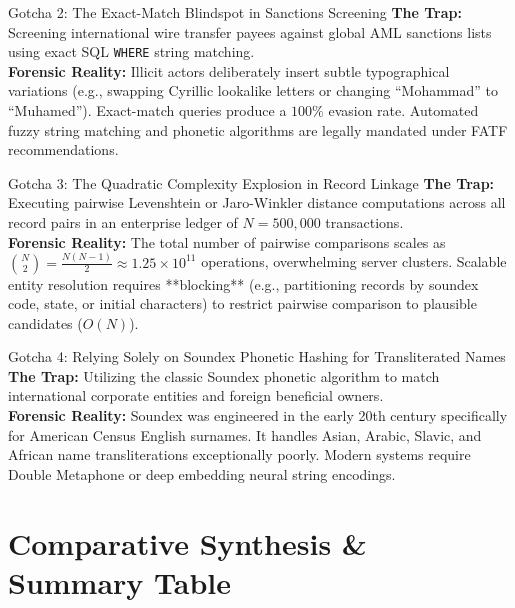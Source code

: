 \begin{trapbox}{Gotcha 2: The Exact-Match Blindspot in Sanctions Screening}
\textbf{The Trap:} Screening international wire transfer payees against global AML sanctions lists using exact SQL \texttt{WHERE} string matching.\\
\textbf{Forensic Reality:} Illicit actors deliberately insert subtle typographical variations (e.g., swapping Cyrillic lookalike letters or changing ``Mohammad'' to ``Muhamed''). Exact-match queries produce a $100\%$ evasion rate. Automated fuzzy string matching and phonetic algorithms are legally mandated under FATF recommendations.
\end{trapbox}

\begin{trapbox}{Gotcha 3: The Quadratic Complexity Explosion in Record Linkage}
\textbf{The Trap:} Executing pairwise Levenshtein or Jaro-Winkler distance computations across all record pairs in an enterprise ledger of $N = 500{,}000$ transactions.\\
\textbf{Forensic Reality:} The total number of pairwise comparisons scales as $\binom{N}{2} = \frac{N(N-1)}{2} \approx 1.25 \times 10^{11}$ operations, overwhelming server clusters. Scalable entity resolution requires **blocking** (e.g., partitioning records by soundex code, state, or initial characters) to restrict pairwise comparison to plausible candidates ($O(N)$).
\end{trapbox}

\begin{trapbox}{Gotcha 4: Relying Solely on Soundex Phonetic Hashing for Transliterated Names}
\textbf{The Trap:} Utilizing the classic Soundex phonetic algorithm to match international corporate entities and foreign beneficial owners.\\
\textbf{Forensic Reality:} Soundex was engineered in the early 20th century specifically for American Census English surnames. It handles Asian, Arabic, Slavic, and African name transliterations exceptionally poorly. Modern systems require Double Metaphone or deep embedding neural string encodings.
\end{trapbox}

\section{Comparative Synthesis \& Summary Table}

